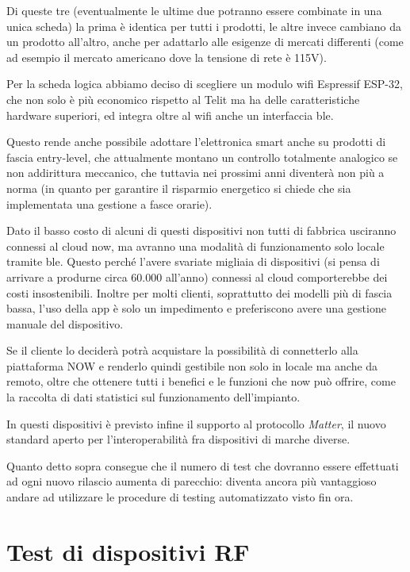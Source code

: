 \documentclass[12pt,a4paper,twoside,titlepage]{book}
\begin{document}
Di queste tre (eventualmente le ultime due potranno essere combinate in una
unica scheda) la prima è identica per tutti i prodotti, le altre invece cambiano
da un prodotto all'altro, anche per adattarlo alle esigenze di mercati differenti
(come ad esempio il mercato americano dove la tensione di rete è 115V).

Per la scheda logica abbiamo deciso di scegliere un modulo \acrshort{wifi} Espressif
ESP-32, che non solo è più economico rispetto al Telit ma ha delle caratteristiche
hardware superiori, ed integra oltre al \Gls{wifi} anche un interfaccia \acrshort{ble}.

Questo rende anche possibile adottare l'elettronica smart anche su prodotti di
fascia entry-level, che attualmente montano un controllo totalmente analogico se non
addirittura meccanico, che tuttavia nei prossimi anni diventerà non più a norma (in
quanto per garantire il risparmio energetico si chiede che sia implementata una gestione
a fasce orarie).

Dato il basso costo di alcuni di questi dispositivi non tutti di fabbrica usciranno
connessi al cloud \Gls{now}, ma avranno una modalità di funzionamento solo locale
tramite \acrshort{ble}. Questo perché l'avere svariate migliaia di dispositivi
(si pensa di arrivare a produrne circa 60.000 all'anno) connessi al cloud comporterebbe
dei costi insostenibili. Inoltre per molti clienti, soprattutto dei modelli più di
fascia bassa, l'uso della app è solo un impedimento e preferiscono avere una gestione
manuale del dispositivo.

Se il cliente lo deciderà potrà acquistare la possibilità di connetterlo alla piattaforma
NOW e renderlo quindi gestibile non solo in locale ma anche da remoto, oltre che
ottenere tutti i benefici e le funzioni che \Gls{now} può offrire, come la
raccolta di dati statistici sul funzionamento dell'impianto.

In questi dispositivi è previsto infine il supporto al protocollo \textit{Matter},
il nuovo standard aperto per l'interoperabilità fra dispositivi di marche diverse.

Quanto detto sopra consegue che il numero di test che dovranno essere effettuati ad
ogni nuovo rilascio aumenta di parecchio: diventa ancora più vantaggioso andare ad
utilizzare le procedure di testing automatizzato visto fin ora.

\section{Test di dispositivi RF}
\end{document}
